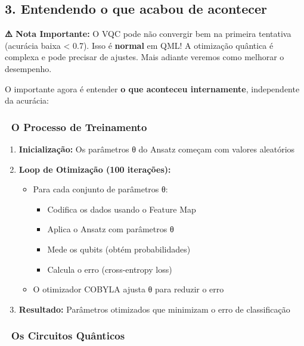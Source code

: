 \documentclass[
  brazilian,
]{report}
\providecommand{\tightlist}{%
  \setlength{\itemsep}{0pt}\setlength{\parskip}{0pt}}
\begin{document}
\subsection{3. Entendendo o que acabou de
acontecer}\label{entendendo-o-que-acabou-de-acontecer}

\textbf{⚠️ Nota Importante:} O VQC pode não convergir bem na primeira
tentativa (acurácia baixa \textless{} 0.7). Isso é \textbf{normal} em
QML! A otimização quântica é complexa e pode precisar de ajustes. Mais
adiante veremos como melhorar o desempenho.

O importante agora é entender \textbf{o que aconteceu internamente},
independente da acurácia:

\subsubsection{🔄 O Processo de
Treinamento}\label{o-processo-de-treinamento}

\begin{enumerate}
\def\labelenumi{\arabic{enumi}.}
\tightlist
\item
  \textbf{Inicialização:} Os parâmetros θ do Ansatz começam com valores
  aleatórios
\item
  \textbf{Loop de Otimização (100 iterações):}

  \begin{itemize}
  \tightlist
  \item
    Para cada conjunto de parâmetros θ:

    \begin{itemize}
    \tightlist
    \item
      Codifica os dados usando o Feature Map
    \item
      Aplica o Ansatz com parâmetros θ
    \item
      Mede os qubits (obtém probabilidades)
    \item
      Calcula o erro (cross-entropy loss)
    \end{itemize}
  \item
    O otimizador COBYLA ajusta θ para reduzir o erro
  \end{itemize}
\item
  \textbf{Resultado:} Parâmetros otimizados que minimizam o erro de
  classificação
\end{enumerate}

\subsubsection{🎨 Os Circuitos
Quânticos}\label{os-circuitos-quuxe2nticos}
\end{document}
